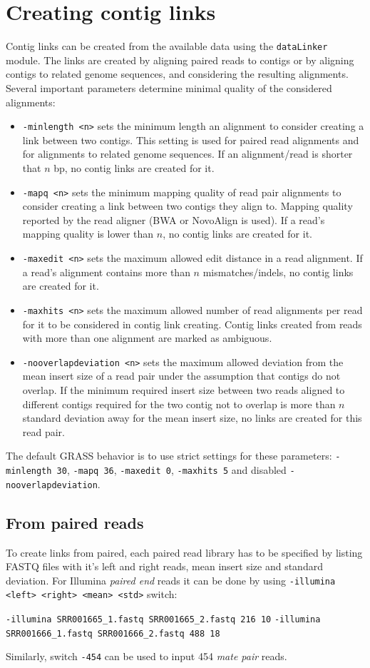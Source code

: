 \documentclass[12pt, a4paper]{report}
\begin{document}
\section{Creating contig links} 
Contig links can be created from the available data using the \verb=dataLinker= module. The links are created by aligning paired reads to contigs or by aligning contigs to related genome sequences, and considering the resulting alignments. Several important parameters determine minimal quality of the considered alignments:
\begin{itemize}
\item \verb=-minlength <n>= sets the minimum length an alignment to consider creating a link between two contigs. This setting is used for paired read alignments and for alignments to related genome sequences. If an alignment/read is shorter that $n$ bp, no contig links are created for it.
\item \verb=-mapq <n>= sets the minimum mapping quality of read pair alignments to consider creating a link between two contigs they align to. Mapping quality reported by the read aligner (BWA or NovoAlign is used). If a read's mapping quality is lower than $n$, no contig links are created for it.
\item \verb=-maxedit <n>= sets the maximum allowed edit distance in a read alignment. If a read's alignment contains more than $n$ mismatches/indels, no contig links are created for it.
\item \verb=-maxhits <n>= sets the maximum allowed number of read alignments per read for it to be considered in contig link creating. Contig links created from reads with more than one alignment are marked as ambiguous.
\item \verb=-nooverlapdeviation <n>= sets the maximum allowed deviation from the mean insert size of a read pair under the assumption that contigs do not overlap. If the minimum required insert size between two reads aligned to different contigs required for the two contig not to overlap is more than $n$ standard deviation away for the mean insert size, no links are created for this read pair.
\end{itemize}

The default GRASS behavior is to use strict settings for these parameters: \verb=-minlength 30=, \verb=-mapq 36=, \verb=-maxedit 0=, \verb=-maxhits 5= and disabled \verb=-nooverlapdeviation=.

\subsection{From paired reads}
To create links from paired, each paired read library has to be specified by listing FASTQ files with it's left and right reads, mean insert size and standard deviation. For Illumina \emph{paired end} reads it can be done by using \verb=-illumina <left> <right> <mean> <std>= switch:
\begin{center}
\verb=-illumina SRR001665_1.fastq SRR001665_2.fastq 216 10=
\verb=-illumina SRR001666_1.fastq SRR001666_2.fastq 488 18=
\end{center}
Similarly, switch \verb=-454= can be used to input 454 \emph{mate pair} reads.
\end{document}

